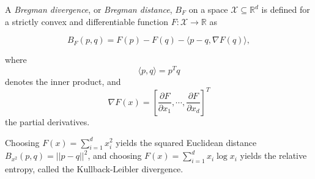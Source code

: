 \documentclass[12pt]{article}
\def\innerproduct#1#2{ {\langle #1,#2 \rangle} }
\begin{document}
A \emph{Bregman divergence}, or \emph{Bregman distance}, $B_F$ on a space $\mathcal{X}\subseteq \mathbb{R}^d$ is defined for a strictly convex and differentiable function $F: \mathcal{X} \to \mathbb{R}$ as

\begin{equation}
B_F(p,q)=F(p)-F(q)-\innerproduct{p-q}{\nabla F(q)},
\end{equation} 

where $$\innerproduct{p}{q}=p^T q$$ denotes the inner product, and $$\nabla F(x)=[\frac{\partial F}{\partial x_1}, \cdots , \frac{\partial F}{\partial x_d}]^T$$ the partial derivatives.

Choosing $F(x)=\sum_{i=1}^d x_i^2$ yields the squared Euclidean distance $B_{x^2}(p,q)=||p-q||^2$, and choosing $F(x)=\sum_{i=1}^d x_i\log x_i$ yields the relative entropy, called the Kullback-Leibler divergence.
\end{document}
